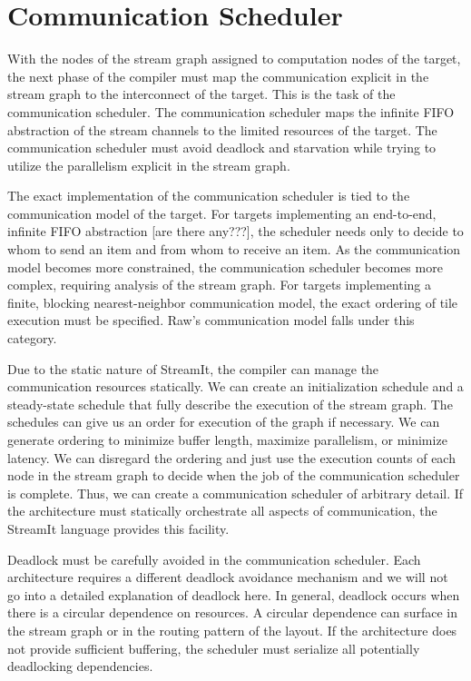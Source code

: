 \section{Communication Scheduler}
\label{sec:communic}

With the nodes of the stream graph assigned to computation nodes of
the target, the next phase of the compiler must map the communication
explicit in the stream graph to the interconnect of the target.  This
is the task of the communication scheduler.  The communication
scheduler maps the infinite FIFO abstraction of the stream channels to
the limited resources of the target.  The communication scheduler must
avoid deadlock and starvation while trying to utilize the parallelism
explicit in the stream graph.

The exact implementation of the communication scheduler is tied to the
communication model of the target.  For targets implementing an
end-to-end, infinite FIFO abstraction [are there any???], the
scheduler needs only to decide to whom to send an item and from whom
to receive an item.  As the communication model becomes more
constrained, the communication scheduler becomes more complex,
requiring analysis of the stream graph. For targets implementing a
finite, blocking nearest-neighbor communication model, the exact ordering
of tile execution must be specified.  Raw's communication model falls
under this category.

Due to the static nature of StreamIt, the compiler can manage the
communication resources statically.  We can create an initialization
schedule and a steady-state schedule that fully describe the execution
of the stream graph.  The schedules can give us an order for execution
of the graph if necessary.  We can generate ordering to minimize
buffer length, maximize parallelism, or minimize latency.  We can
disregard the ordering and just use the execution counts of each node
in the stream graph to decide when the job of the communication
scheduler is complete.  Thus, we can create a communication scheduler
of arbitrary detail.  If the architecture must statically orchestrate
all aspects of communication, the StreamIt language provides this
facility.

Deadlock must be carefully avoided in the communication
scheduler. Each architecture requires a different deadlock avoidance
mechanism and we will not go into a detailed explanation of deadlock
here.  In general, deadlock occurs when there is a circular dependence
on resources.  A circular dependence can surface in the stream graph
or in the routing pattern of the layout.  If the architecture does not
provide sufficient buffering, the scheduler must serialize all
potentially deadlocking dependencies.

